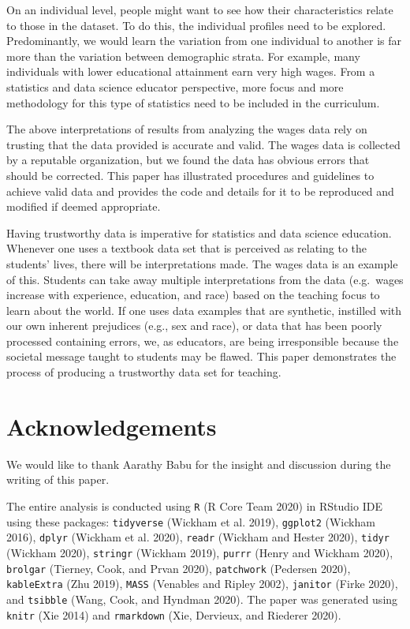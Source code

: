 \documentclass[12pt]{article}
\begin{document}
On an individual level, people might want to see how their characteristics relate to those in the dataset. To do this, the individual profiles need to be explored. Predominantly, we would learn the variation from one individual to another is far more than the variation between demographic strata. For example, many individuals with lower educational attainment earn very high wages. From a statistics and data science educator perspective, more focus and more methodology for this type of statistics need to be included in the curriculum.

The above interpretations of results from analyzing the wages data rely on trusting that the data provided is accurate and valid. The wages data is collected by a reputable organization, but we found the data has obvious errors that should be corrected. This paper has illustrated procedures and guidelines to achieve valid data and provides the code and details for it to be reproduced and modified if deemed appropriate.

Having trustworthy data is imperative for statistics and data science education. Whenever one uses a textbook data set that is perceived as relating to the students' lives, there will be interpretations made. The wages data is an example of this. Students can take away multiple interpretations from the data (e.g.~wages increase with experience, education, and race) based on the teaching focus to learn about the world. If one uses data examples that are synthetic, instilled with our own inherent prejudices (e.g., sex and race), or data that has been poorly processed containing errors, we, as educators, are being irresponsible because the societal message taught to students may be flawed. This paper demonstrates the process of producing a trustworthy data set for teaching.

\hypertarget{acknowledgements}{%
\section{Acknowledgements}\label{acknowledgements}}

We would like to thank Aarathy Babu for the insight and discussion during the writing of this paper.

The entire analysis is conducted using \texttt{R} (R Core Team 2020) in RStudio IDE using these packages: \texttt{tidyverse} (Wickham et al. 2019), \texttt{ggplot2} (Wickham 2016), \texttt{dplyr} (Wickham et al. 2020), \texttt{readr} (Wickham and Hester 2020), \texttt{tidyr} (Wickham 2020), \texttt{stringr} (Wickham 2019), \texttt{purrr} (Henry and Wickham 2020), \texttt{brolgar} (Tierney, Cook, and Prvan 2020), \texttt{patchwork} (Pedersen 2020), \texttt{kableExtra} (Zhu 2019), \texttt{MASS} (Venables and Ripley 2002), \texttt{janitor} (Firke 2020), and \texttt{tsibble} (Wang, Cook, and Hyndman 2020). The paper was generated using \texttt{knitr} (Xie 2014) and \texttt{rmarkdown} (Xie, Dervieux, and Riederer 2020).
\end{document}
